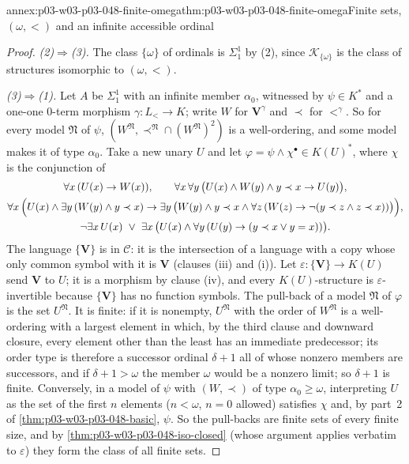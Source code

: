 \begin{annexitem}{annex:p03-w03-p03-048-finite-omega}{thm:p03-w03-p03-048-finite-omega}{Finite sets, \((\omega,<)\) and an infinite accessible ordinal}
\begin{proof}
\emph{(2)\(\Rightarrow\)(3).}  The class \(\{\omega\}\) of ordinals is
\(\Sigma^1_1\) by (2), since \(\mathcal K_{\{\omega\}}\) is the class of
structures isomorphic to \((\omega,<)\).

\emph{(3)\(\Rightarrow\)(1).}  Let \(A\) be \(\Sigma^1_1\) with an infinite
member \(\alpha_0\), witnessed by \(\psi\in K^{\ast}\) and a one-one
\(0\)-term morphism \(\gamma:L_{<}\to K\); write \(W\) for
\(\mathbf V^{\gamma}\) and \(\prec\) for \(<^{\gamma}\).  So for every model
\(\mathfrak N\) of \(\psi\), \((W^{\mathfrak N},\prec^{\mathfrak N}\cap
(W^{\mathfrak N})^{2})\) is a well-ordering, and some model makes it of type
\(\alpha_0\).  Take a new unary \(U\) and let
\(\varphi=\psi\land\chi^{\bullet}\in K(U)^{\ast}\), where \(\chi\) is the
conjunction of
\begin{gather*}
\forall x\,(U(x)\to W(x)),\qquad
\forall x\,\forall y\,\bigl(U(x)\land W(y)\land y\prec x\to U(y)\bigr),\\
\forall x\,\Bigl(U(x)\land\exists y\,(W(y)\land y\prec x)\to\exists y\,
\bigl(W(y)\land y\prec x\land\forall z\,(W(z)\to\neg(y\prec z\land z\prec
x))\bigr)\Bigr),\\
\neg\exists x\,U(x)\ \lor\ \exists x\,\bigl(U(x)\land\forall y\,(U(y)\to
(y\prec x\lor y=x))\bigr).
\end{gather*}
The language \(\{\mathbf V\}\) is in \(\mathcal C\): it is the intersection of
a language with a copy whose only common symbol with it is \(\mathbf V\)
(clauses (iii) and (i)).  Let \(\varepsilon:\{\mathbf V\}\to K(U)\) send
\(\mathbf V\) to \(U\); it is a morphism by clause (iv), and every
\(K(U)\)-structure is \(\varepsilon\)-invertible because \(\{\mathbf V\}\)
has no function symbols.  The pull-back of a model \(\mathfrak N\) of
\(\varphi\) is the set \(U^{\mathfrak N}\).  It is finite: if it is nonempty,
\(U^{\mathfrak N}\) with the order of \(W^{\mathfrak N}\) is a well-ordering
with a largest element in which, by the third clause and downward closure,
every element other than the least has an immediate predecessor; its order
type is therefore a successor ordinal \(\delta+1\) all of whose nonzero
members are successors, and if \(\delta+1>\omega\) the member \(\omega\)
would be a nonzero limit; so \(\delta+1\) is finite.  Conversely, in a model
of \(\psi\) with \((W,\prec)\) of type \(\alpha_0\geq\omega\), interpreting
\(U\) as the set of the first \(n\) elements (\(n<\omega\), \(n=0\)
allowed) satisfies \(\chi\) and, by part~2 of
\cref{thm:p03-w03-p03-048-basic}, \(\psi\).  So the pull-backs are finite
sets of every finite size, and by \cref{thm:p03-w03-p03-048-iso-closed}
(whose argument applies verbatim to \(\varepsilon\)) they form the class of
all finite sets.


\end{proof}
\end{annexitem}

